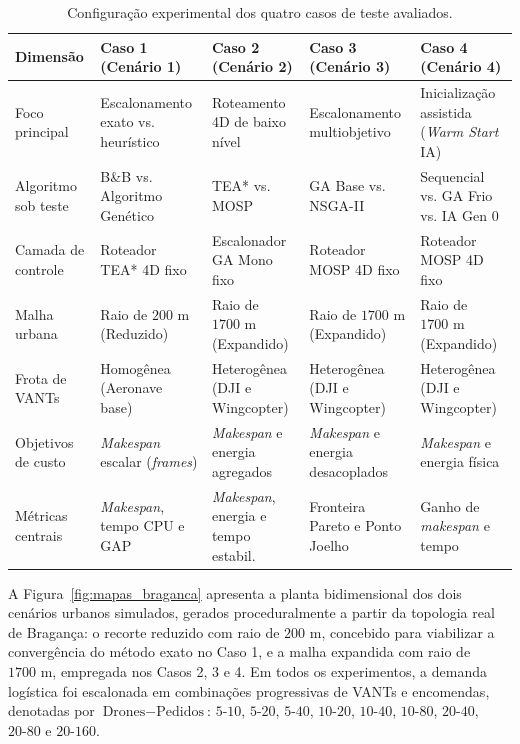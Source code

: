 \begin{table}[htbp]
\centering
\scriptsize
\caption{Configuração experimental dos quatro casos de teste avaliados.}\label{tab:resumo_casos}
\begin{tabular}{p{2.3cm}p{3.1cm}p{3.2cm}p{3.2cm}p{3.2cm}}
\toprule
\textbf{Dimensão} & \textbf{Caso 1 (Cenário 1)} & \textbf{Caso 2 (Cenário 2)} & \textbf{Caso 3 (Cenário 3)} & \textbf{Caso 4 (Cenário 4)} \\
\midrule
Foco principal & Escalonamento exato vs. heurístico & Roteamento 4D de baixo nível & Escalonamento multiobjetivo & Inicialização assistida (\textit{Warm Start} IA) \\
Algoritmo sob teste & B\&B vs. Algoritmo Genético & TEA* vs. MOSP & GA Base vs. NSGA-II & Sequencial vs. GA Frio vs. IA Gen 0 \\
Camada de controle & Roteador TEA* 4D fixo & Escalonador GA Mono fixo & Roteador MOSP 4D fixo & Roteador MOSP 4D fixo \\
Malha urbana & Raio de $200\text{ m}$ (Reduzido) & Raio de $1700\text{ m}$ (Expandido) & Raio de $1700\text{ m}$ (Expandido) & Raio de $1700\text{ m}$ (Expandido) \\
Frota de VANTs & Homogênea (Aeronave base) & Heterogênea (DJI e Wingcopter) & Heterogênea (DJI e Wingcopter) & Heterogênea (DJI e Wingcopter) \\
Objetivos de custo & \textit{Makespan} escalar (\textit{frames}) & \textit{Makespan} e energia agregados & \textit{Makespan} e energia desacoplados & \textit{Makespan} e energia física \\
Métricas centrais & \textit{Makespan}, tempo CPU e GAP & \textit{Makespan}, energia e tempo estabil. & Fronteira Pareto e Ponto Joelho & Ganho de \textit{makespan} e tempo \\
\bottomrule
\end{tabular}
\end{table}

A Figura~\ref{fig:mapas_braganca} apresenta a planta bidimensional dos dois cenários urbanos simulados, gerados proceduralmente a partir da topologia real de Bragança: o recorte reduzido com raio de $200\text{ m}$, concebido para viabilizar a convergência do método exato no Caso 1, e a malha expandida com raio de $1700\text{ m}$, empregada nos Casos 2, 3 e 4. Em todos os experimentos, a demanda logística foi escalonada em combinações progressivas de VANTs e encomendas, denotadas por $\text{Drones}-\text{Pedidos}$: $5\text{-}10$, $5\text{-}20$, $5\text{-}40$, $10\text{-}20$, $10\text{-}40$, $10\text{-}80$, $20\text{-}40$, $20\text{-}80$ e $20\text{-}160$.

